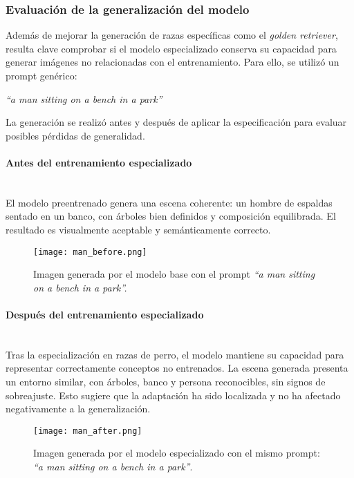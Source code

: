 \subsubsection{Evaluación de la generalización del modelo}

Además de mejorar la generación de razas específicas como el \textit{golden retriever}, resulta clave comprobar si el modelo especializado conserva su capacidad para generar imágenes no relacionadas con el entrenamiento. Para ello, se utilizó un prompt genérico:

\begin{center}
\textit{``a man sitting on a bench in a park''}
\end{center}

La generación se realizó antes y después de aplicar la especificación para evaluar posibles pérdidas de generalidad.

\paragraph{\textbf{Antes del entrenamiento especializado}} \mbox{}\\[0.5em]
El modelo preentrenado genera una escena coherente: un hombre de espaldas sentado en un banco, con árboles bien definidos y composición equilibrada. El resultado es visualmente aceptable y semánticamente correcto.

\begin{figure}[H]
    \centering
    \texttt{[image: man\_before.png]}
    \caption{Imagen generada por el modelo base con el prompt \textit{``a man sitting on a bench in a park''.}}
    \label{fig:man-before}
\end{figure}

\paragraph{\textbf{Después del entrenamiento especializado}} \mbox{}\\[0.5em]
Tras la especialización en razas de perro, el modelo mantiene su capacidad para representar correctamente conceptos no entrenados. La escena generada presenta un entorno similar, con árboles, banco y persona reconocibles, sin signos de sobreajuste. Esto sugiere que la adaptación ha sido localizada y no ha afectado negativamente a la generalización.

\begin{figure}[H]
    \centering
    \texttt{[image: man\_after.png]}
    \caption{Imagen generada por el modelo especializado con el mismo prompt: \textit{``a man sitting on a bench in a park''}.}
    \label{fig:man-after}
\end{figure}

